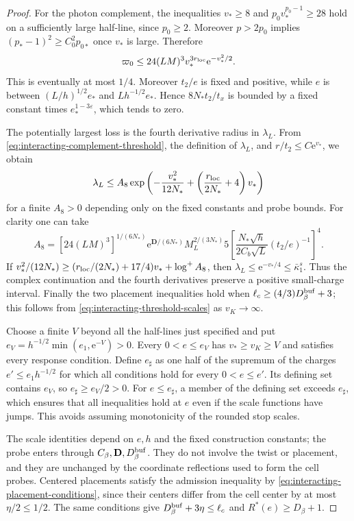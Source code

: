 \begin{proof}
For the photon complement, the inequalities $v_*\ge8$ and
$p_0v_*^{p_0-1}\ge28$ hold on a sufficiently large half-line,
since $p_0\ge2$. Moreover $p>2p_0$ implies
$(p_*-1)^2\ge C_0^2p_{0*}$ once $v_*$
is large. Therefore
\begin{equation}\label{eq:interacting-complement-threshold}
 \varpi_0\le24(LM)^3v_*^{3r_{\rm loc}}\mathrm e^{-v_*^2/2}.
\end{equation}
This is eventually at most $1/4$.
Moreover $t_2/e$ is fixed and positive, while
$e$ is between $(L/h)^{1/2}e_*$
and $Lh^{-1/2}e_*$. Hence
$8N_*t_2/t_x$ is bounded by a fixed
constant times $e_*^{1-3\varepsilon}$,
which tends to zero.

The potentially largest loss is the fourth
derivative radius in $\lambda_L$.
From \eqref{eq:interacting-complement-threshold},
the definition of $\lambda_L$, and
$r/t_2\le C \mathrm e^{v_*}$, we obtain
\begin{equation}\label{eq:interacting-lambda-threshold}
 \lambda_L\le A_8
   \exp\left(-\frac{v_*^2}{12N_*}
                     +\left(\frac{r_{\rm loc}}{2N_*}+4\right)v_*\right)
\end{equation}
for a finite $A_8>0$ depending only on the
fixed constants and probe bounds.
For clarity one can take
\[
 A_8=[24(LM)^3]^{1/(6N_*)}
       \mathrm e^{\mathbf D/(6N_*)}M_L^{2/(3N_*)}
       5\left[
        \frac{N_*\sqrt h}{2C_b\sqrt L}(t_2/e)^{-1}\right]^4 .
\]
If
$v_*^2/(12N_*)\ge
(r_{\rm loc}/(2N_*)+17/4)v_*+\log^+A_8$,
then $\lambda_L\le \mathrm e^{-v_*/4}\le\bar\kappa_1^s$.
Thus the complex continuation and the
fourth derivatives preserve a positive
small-charge interval.
Finally the two placement inequalities
hold when
$\ell_c\ge(4/3)D_\beta^{\rm buf}+3$;
this follows from
\eqref{eq:interacting-threshold-scales} as $v_K\to\infty$.

Choose a finite $V$ beyond all the half-lines
just specified and put
$e_V=h^{-1/2}\min(e_1,\mathrm e^{-V})>0$.
Every $0<e\le e_V$ has $v_*\ge v_K\ge V$
and satisfies every response condition.
Define $e_\sharp$ as one half of the
supremum of the charges $e'\le e_1h^{-1/2}$
for which all conditions hold for every
$0<e\le e'$. Its defining set contains
$e_V$, so $e_\sharp\ge e_V/2>0$.
For $e\le e_\sharp$, a member of the
defining set exceeds $e_\sharp$, which
ensures that all inequalities hold at $e$
even if the scale functions have jumps.
This avoids assuming monotonicity of the
rounded stop scales.

The scale identities depend on $e,h$ and
the fixed construction constants; the probe
enters through
$C_\beta,\mathbf D,D_\beta^{\rm buf}$.
They do not involve the twist or placement,
and they are unchanged by the coordinate
reflections used to form the cell probes.
Centered placements satisfy the admission
inequality by
\eqref{eq:interacting-placement-conditions},
since their centers differ from the cell
center by at most $\eta/2\le1/2$.
The same conditions give
$D_\beta^{\rm buf}+3\eta\le\ell_c$ and
$R^*(e)\ge D_\beta+1$.
\end{proof}




